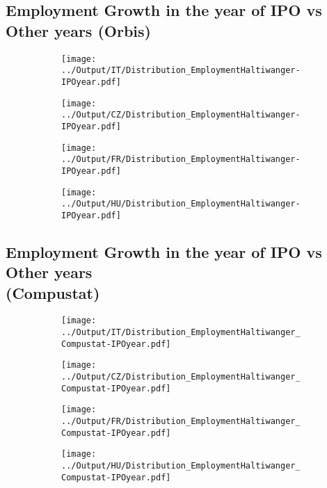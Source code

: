 \documentclass[12pt,notitlepage]{article}
\begin{document}
\subsection{Employment Growth in the year of IPO vs Other years (Orbis)}
\begin{figure}[!htpb]
\centering
\begin{subfigure}{.49\textwidth}
    \centering
 \texttt{[image: ../Output/IT/Distribution\_EmploymentHaltiwanger-IPOyear.pdf]}
\end{subfigure}%
\begin{subfigure}{.49\textwidth}
    \centering
 \texttt{[image: ../Output/CZ/Distribution\_EmploymentHaltiwanger-IPOyear.pdf]}
\end{subfigure}
\begin{subfigure}{.49\textwidth}
    \centering
 \texttt{[image: ../Output/FR/Distribution\_EmploymentHaltiwanger-IPOyear.pdf]}
\end{subfigure}%
\begin{subfigure}{.49\textwidth}
    \centering
 \texttt{[image: ../Output/HU/Distribution\_EmploymentHaltiwanger-IPOyear.pdf]}
\end{subfigure}
\end{figure}
\pagebreak

\subsection{Employment Growth in the year of IPO vs Other years \\(Compustat)}
\begin{figure}[!htpb]
\centering
\begin{subfigure}{.49\textwidth}
    \centering
 \texttt{[image: ../Output/IT/Distribution\_EmploymentHaltiwanger\_Compustat-IPOyear.pdf]}
\end{subfigure}%
\begin{subfigure}{.49\textwidth}
    \centering
 \texttt{[image: ../Output/CZ/Distribution\_EmploymentHaltiwanger\_Compustat-IPOyear.pdf]}
\end{subfigure}
\begin{subfigure}{.49\textwidth}
    \centering
 \texttt{[image: ../Output/FR/Distribution\_EmploymentHaltiwanger\_Compustat-IPOyear.pdf]}
\end{subfigure}%
\begin{subfigure}{.49\textwidth}
    \centering
 \texttt{[image: ../Output/HU/Distribution\_EmploymentHaltiwanger\_Compustat-IPOyear.pdf]}
\end{subfigure}
\end{figure}
\pagebreak
\end{document}
